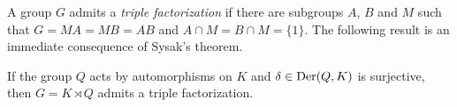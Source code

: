 A group $G$ admits a {\em triple factorization} if there are subgroups 
$A$, $B$ and $M$ such that $G=MA=MB=AB$ and $A\cap M=B\cap M=\{1\}$.
The following result is an immediate consequence of Sysak's theorem.

\begin{corollary}
	If the group $Q$ acts by automorphisms on $K$ and $\delta\in\operatorname{Der}(Q,K)$ is
	surjective, then $G=K\rtimes Q$ admits a triple factorization. 
\end{corollary}




